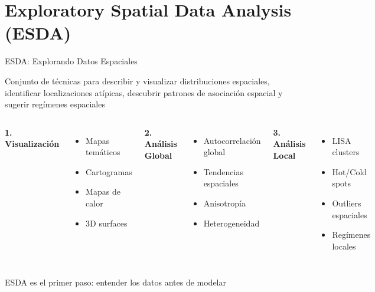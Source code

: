 \documentclass[10pt,aspectratio=169]{beamer}
\newcommand{\conceptbox}[2]{
\begin{tcolorbox}[colframe=usachblue,colback=blue!5,title=#1,fonttitle=\bfseries]
#2
\end{tcolorbox}
}
\newcommand{\tipbox}[1]{
\begin{tcolorbox}[colframe=green!70,colback=green!5]
\centering\faLightbulb\space #1
\end{tcolorbox}
}
\begin{document}
\section{Exploratory Spatial Data Analysis (ESDA)}

\begin{frame}{ESDA: Explorando Datos Espaciales}
    \conceptbox{¿Qué es ESDA?}{
        Conjunto de técnicas para describir y visualizar distribuciones espaciales, identificar localizaciones atípicas, descubrir patrones de asociación espacial y sugerir regímenes espaciales
    }
    
    \begin{columns}[T]
        \textbf{1. Visualización}
        \begin{itemize}
            \item Mapas temáticos
            \item Cartogramas
            \item Mapas de calor
            \item 3D surfaces
        \end{itemize}
        
        \textbf{2. Análisis Global}
        \begin{itemize}
            \item Autocorrelación global
            \item Tendencias espaciales
            \item Anisotropía
            \item Heterogeneidad
        \end{itemize}
        
        \textbf{3. Análisis Local}
        \begin{itemize}
            \item LISA clusters
            \item Hot/Cold spots
            \item Outliers espaciales
            \item Regímenes locales
        \end{itemize}
    \end{columns}
    
    \vspace{0.3cm}
    \tipbox{ESDA es el primer paso: entender los datos antes de modelar}
\end{frame}
\end{document}
